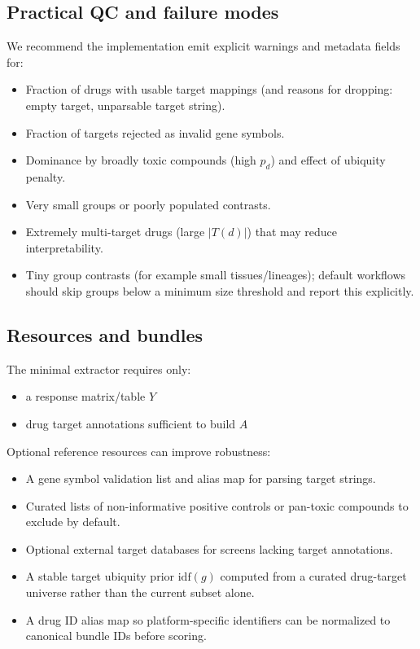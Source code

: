 \documentclass[11pt]{article}
\begin{document}
\subsection{Practical QC and failure modes}
We recommend the implementation emit explicit warnings and metadata fields for:
\begin{itemize}
  \item Fraction of drugs with usable target mappings (and reasons for dropping: empty target, unparsable target string).
  \item Fraction of targets rejected as invalid gene symbols.
  \item Dominance by broadly toxic compounds (high $p_d$) and effect of ubiquity penalty.
  \item Very small groups or poorly populated contrasts.
  \item Extremely multi-target drugs (large $|T(d)|$) that may reduce interpretability.
  \item Tiny group contrasts (for example small tissues/lineages); default workflows should skip groups below a minimum size threshold and report this explicitly.
\end{itemize}

\subsection{Resources and bundles}
The minimal extractor requires only:
\begin{itemize}
  \item a response matrix/table $Y$
  \item drug target annotations sufficient to build $A$
\end{itemize}

Optional reference resources can improve robustness:
\begin{itemize}
  \item A gene symbol validation list and alias map for parsing target strings.
  \item Curated lists of non-informative positive controls or pan-toxic compounds to exclude by default.
  \item Optional external target databases for screens lacking target annotations.
  \item A stable target ubiquity prior $\mathrm{idf}(g)$ computed from a curated drug-target universe rather than the current subset alone.
  \item A drug ID alias map so platform-specific identifiers can be normalized to canonical bundle IDs before scoring.
\end{itemize}
\end{document}
